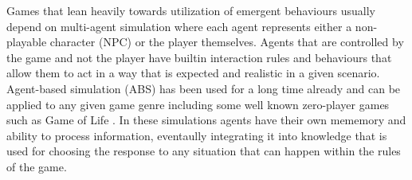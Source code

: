 Games that lean heavily towards utilization of emergent behaviours usually depend on multi-agent simulation where each agent represents either a non-playable character (NPC) or the player themselves.
Agents that are controlled by the game and not the player have builtin interaction rules and behaviours that allow them to act in a way that is expected and realistic in a given scenario.
Agent-based simulation (ABS) has been used for a long time already and can be applied to any given game genre including some well known zero-player games such as Game of Life \cite{chan2010simulation}.
In these simulations agents have their own mememory and ability to process information, eventaully integrating it into knowledge that is used for choosing the response to any situation that can happen within the rules of the game.


